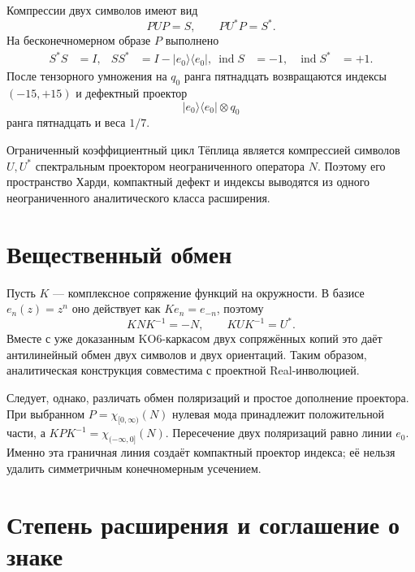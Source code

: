 Компрессии двух символов имеют вид
\begin{equation}
 PUP=S,
 \qquad
 PU^*P=S^*.
 \label{eq:v5-unbounded-compressions}
\end{equation}
На бесконечномерном образе $P$ выполнено
\begin{align}
 S^*S&=I,& SS^*&=I-|e_0\rangle\langle e_0|,\
 \operatorname{ind}S&=-1,& \operatorname{ind}S^*&=+1.
\end{align}
После тензорного умножения на $q_0$ ранга пятнадцать возвращаются
индексы $(-15,+15)$ и дефектный проектор
\begin{equation}
 |e_0\rangle\langle e_0|\otimes q_0
\end{equation}
ранга пятнадцать и веса $1/7$.

\begin{proposition}
Ограниченный коэффициентный цикл Тёплица является компрессией символов
$U,U^*$ спектральным проектором неограниченного оператора $N$. Поэтому
его пространство Харди, компактный дефект и индексы выводятся из одного
неограниченного аналитического класса расширения.
\end{proposition}

\section{Вещественный обмен}

Пусть $K$ --- комплексное сопряжение функций на окружности. В базисе
$e_n(z)=z^n$ оно действует как $Ke_n=e_{-n}$, поэтому
\begin{equation}
 KNK^{-1}=-N,
 \qquad
 KUK^{-1}=U^*.
 \label{eq:v5-unbounded-real-exchange}
\end{equation}
Вместе с уже доказанным KO6-каркасом двух сопряжённых копий это даёт
антилинейный обмен двух символов и двух ориентаций. Таким образом,
аналитическая конструкция совместима с проектной Real-инволюцией.

Следует, однако, различать обмен поляризаций и простое дополнение
проектора. При выбранном $P=\chi_{[0,\infty)}(N)$ нулевая мода принадлежит
положительной части, а $KPK^{-1}=\chi_{(-\infty,0]}(N)$. Пересечение двух
поляризаций равно линии $e_0$. Именно эта граничная линия создаёт
компактный проектор индекса; её нельзя удалить симметричным конечномерным
усечением.

\section{Степень расширения и соглашение о знаке}

